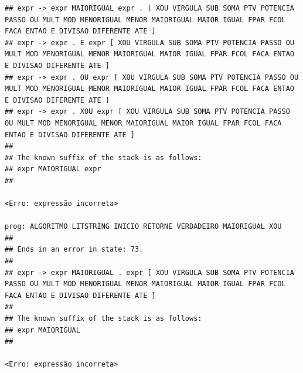 \documentclass[hidelinks,12pt]{article}
\begin{document}
\begin{lstlisting}
## expr -> expr MAIORIGUAL expr . [ XOU VIRGULA SUB SOMA PTV POTENCIA PASSO OU MULT MOD MENORIGUAL MENOR MAIORIGUAL MAIOR IGUAL FPAR FCOL FACA ENTAO E DIVISAO DIFERENTE ATE ]
## expr -> expr . E expr [ XOU VIRGULA SUB SOMA PTV POTENCIA PASSO OU MULT MOD MENORIGUAL MENOR MAIORIGUAL MAIOR IGUAL FPAR FCOL FACA ENTAO E DIVISAO DIFERENTE ATE ]
## expr -> expr . OU expr [ XOU VIRGULA SUB SOMA PTV POTENCIA PASSO OU MULT MOD MENORIGUAL MENOR MAIORIGUAL MAIOR IGUAL FPAR FCOL FACA ENTAO E DIVISAO DIFERENTE ATE ]
## expr -> expr . XOU expr [ XOU VIRGULA SUB SOMA PTV POTENCIA PASSO OU MULT MOD MENORIGUAL MENOR MAIORIGUAL MAIOR IGUAL FPAR FCOL FACA ENTAO E DIVISAO DIFERENTE ATE ]
##
## The known suffix of the stack is as follows:
## expr MAIORIGUAL expr 
##

<Erro: expressão incorreta>

prog: ALGORITMO LITSTRING INICIO RETORNE VERDADEIRO MAIORIGUAL XOU 
##
## Ends in an error in state: 73.
##
## expr -> expr MAIORIGUAL . expr [ XOU VIRGULA SUB SOMA PTV POTENCIA PASSO OU MULT MOD MENORIGUAL MENOR MAIORIGUAL MAIOR IGUAL FPAR FCOL FACA ENTAO E DIVISAO DIFERENTE ATE ]
##
## The known suffix of the stack is as follows:
## expr MAIORIGUAL 
##

<Erro: expressão incorreta>


\end{lstlisting}
\end{document}
